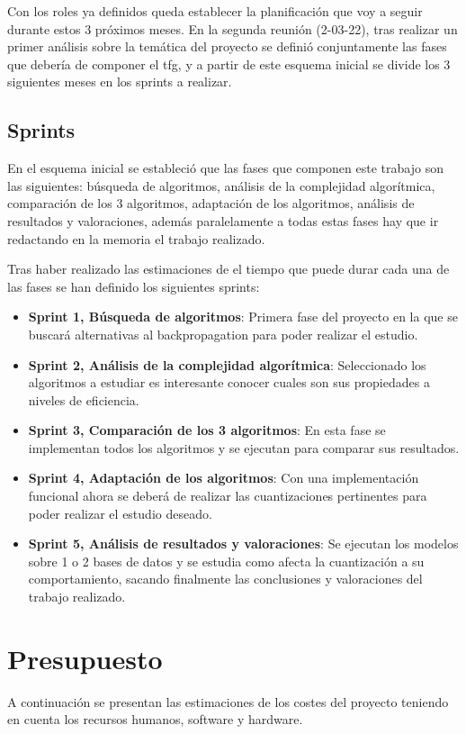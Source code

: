 Con los roles ya definidos queda establecer la planificación que voy a seguir durante estos 3 próximos meses. En la segunda reunión (2-03-22), tras realizar un primer análisis sobre la temática del proyecto se definió conjuntamente las fases que debería de componer el tfg, y a partir de este esquema inicial se divide los 3 siguientes meses en los sprints a realizar.

\subsection{Sprints}

En el esquema inicial se estableció que las fases que componen este trabajo son las siguientes: búsqueda de algoritmos, análisis de la complejidad algorítmica, comparación de los 3 algoritmos, adaptación de los algoritmos, análisis de resultados y valoraciones, además paralelamente a todas estas fases hay que ir redactando en la memoria el trabajo realizado.

Tras haber realizado las estimaciones de el tiempo que puede durar cada una de las fases se han definido los siguientes sprints:

\begin{itemize}
    \item \textbf{Sprint 1, Búsqueda de algoritmos}: Primera fase del proyecto en la que se buscará alternativas al backpropagation para poder realizar el estudio.
    \item \textbf{Sprint 2, Análisis de la complejidad algorítmica}: Seleccionado los algoritmos a estudiar es interesante conocer cuales son sus propiedades a niveles de eficiencia.
    \item \textbf{Sprint 3, Comparación de los 3 algoritmos}: En esta fase se implementan todos los algoritmos y se ejecutan para comparar sus resultados.
    \item \textbf{Sprint 4, Adaptación de los algoritmos}: Con una implementación funcional ahora se deberá de realizar las cuantizaciones pertinentes para poder realizar el estudio deseado.
    \item \textbf{Sprint 5, Análisis de resultados y valoraciones}: Se ejecutan los modelos sobre 1 o 2 bases de datos y se estudia como afecta la cuantización a su comportamiento, sacando finalmente las conclusiones y valoraciones del trabajo realizado.
\end{itemize}

\section{Presupuesto}
A continuación se presentan las estimaciones de los costes del proyecto teniendo en cuenta los recursos humanos, software y hardware.

